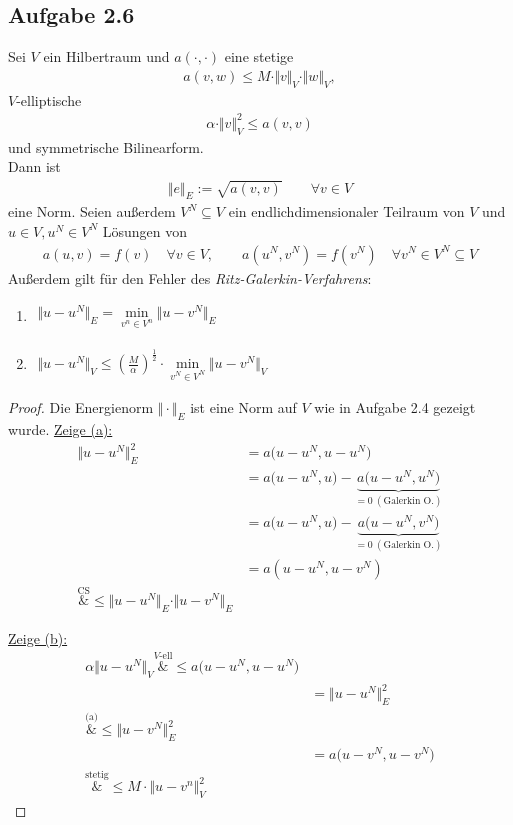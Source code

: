 \subsection{Aufgabe 2.6}
Sei $V$ ein Hilbertraum und  $a(\cdot,\cdot)$ eine stetige
\begin{align*}
	a(v,w)\leq M\cdot\Vert v\Vert_V\cdot\Vert w\Vert_V,
\end{align*}
$V$-elliptische
\begin{align*}
	\alpha\cdot\Vert v\Vert^2_V\leq a(v,v)
\end{align*}
und symmetrische Bilinearform.\\
Dann ist
\begin{align*}
	\Vert e\Vert_E:=\sqrt{a(v,v)}\qquad\forall v\in V
\end{align*}
eine Norm. 
Seien außerdem $V^N\subseteq V$ ein endlichdimensionaler Teilraum von $V$ und $u\in V,u^N\in V^N$ Lösungen von
\begin{align*}
	a(u,v)=f(v)\quad\forall v\in V,\qquad a(u^N,v^N)=f(v^N)\quad\forall v^N\in V^N\subseteq V
\end{align*}
Außerdem gilt für den Fehler des \textit{Ritz-Galerkin-Verfahrens}:
\begin{enumerate}[label=(\alph*)]
	\item $\begin{aligned}
		\Vert u-u^N\Vert_E=\min\limits_{v^n\in V^n}\Vert u-v^N\Vert_E
	\end{aligned}$
	\item $\begin{aligned}
		\Vert u-u^N\Vert_V\leq\left(\frac{M}{\alpha}\right)^{\frac{1}{2}}\cdot\min\limits_{v^N\in V^N}\Vert u-v^N\Vert_V
	\end{aligned}$
\end{enumerate}

\begin{proof}
	Die Energienorm $\Vert\cdot\Vert_E$ ist eine Norm auf $V$ wie in Aufgabe 2.4 gezeigt wurde.\nl
	\underline{Zeige (a):}
	\begin{align*}
		\Vert u-u^N\Vert_E^2
		&=a\big(u-u^N,u-u^N\big) \\
		&=a\big(u-u^N,u\big) - \underbrace{a\big(u-u^N,u^N\big)}_{=0~(\text{Galerkin O.})} \\
		&=a\big(u-u^N,u\big) - \underbrace{a\big(u-u^N,v^N\big)}_{=0~(\text{Galerkin O.})} \\
		&=a(u-u^N,u-v^N)\\
		\overset{\text{CS}}&{\leq}
		\Vert u-u^N\Vert_E\cdot\Vert u-v^N\Vert_E
	\end{align*}

	\underline{Zeige (b):}
	\begin{align*}
		\alpha\Vert u-u^N\Vert_V
		\overset{V\text{-ell}}&{\leq}
		a\big(u-u^N,u-u^N\big)\\
		&=\big\Vert u-u^N\big\Vert^2_E\\
		\overset{\text{(a)}}&{\leq}
		\big\Vert u-v^N\big\Vert^2_E\\
		&=a\big(u-v^N,u-v^N\big)\\
		\overset{\text{stetig}}&{\leq}
		M\cdot\big\Vert u-v^n\big\Vert^2_V
	\end{align*}
\end{proof}

